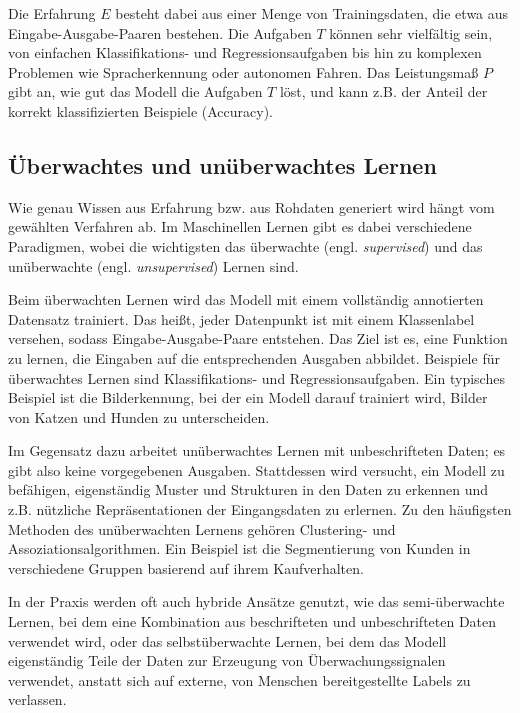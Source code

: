 Die Erfahrung $E$ besteht dabei aus einer Menge von Trainingsdaten, die etwa aus Eingabe-Ausgabe-Paaren bestehen. Die Aufgaben $T$ können sehr vielfältig sein, von einfachen Klassifikations- und Regressionsaufgaben bis hin zu komplexen Problemen wie Spracherkennung oder autonomen Fahren. Das Leistungsmaß $P$ gibt an, wie gut das Modell die Aufgaben $T$ löst, und kann z.B. der Anteil der korrekt klassifizierten Beispiele (Accuracy).

\subsection{Überwachtes und unüberwachtes Lernen} \label{sec:sup-unsup}

Wie genau Wissen aus Erfahrung bzw. aus Rohdaten generiert wird hängt vom gewählten Verfahren ab. Im Maschinellen Lernen gibt es dabei verschiedene Paradigmen, wobei die wichtigsten das überwachte (engl. \textit{supervised}) und das unüberwachte (engl. \textit{unsupervised}) Lernen sind.

Beim überwachten Lernen wird das Modell mit einem vollständig annotierten Datensatz trainiert. Das heißt, jeder Datenpunkt ist mit einem Klassenlabel versehen, sodass Eingabe-Ausgabe-Paare entstehen. Das Ziel ist es, eine Funktion zu lernen, die Eingaben auf die entsprechenden Ausgaben abbildet. Beispiele für überwachtes Lernen sind Klassifikations- und Regressionsaufgaben. Ein typisches Beispiel ist die Bilderkennung, bei der ein Modell darauf trainiert wird, Bilder von Katzen und Hunden zu unterscheiden. \parencite{}

Im Gegensatz dazu arbeitet unüberwachtes Lernen mit unbeschrifteten Daten; es gibt also keine vorgegebenen Ausgaben. Stattdessen wird versucht, ein Modell zu befähigen, eigenständig Muster und Strukturen in den Daten zu erkennen und z.B. nützliche Repräsentationen der Eingangsdaten zu erlernen. Zu den häufigsten Methoden des unüberwachten Lernens gehören Clustering- und Assoziationsalgorithmen. Ein Beispiel ist die Segmentierung von Kunden in verschiedene Gruppen basierend auf ihrem Kaufverhalten. \parencite{}

In der Praxis werden oft auch hybride Ansätze genutzt, wie das semi-überwachte Lernen, bei dem eine Kombination aus beschrifteten und unbeschrifteten Daten verwendet wird, oder das selbstüberwachte Lernen, bei dem das Modell eigenständig Teile der Daten zur Erzeugung von Überwachungssignalen verwendet, anstatt sich auf externe, von Menschen bereitgestellte Labels zu verlassen. \parencite{}

